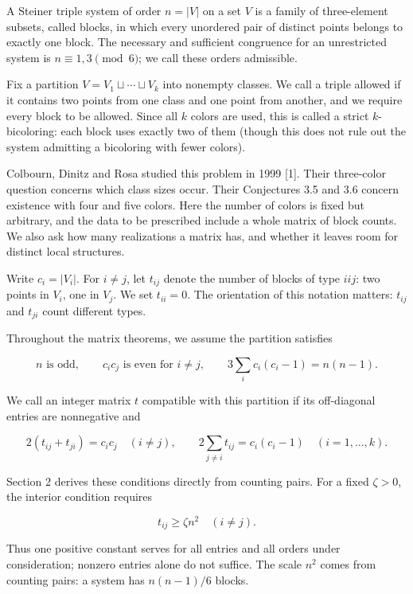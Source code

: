 \documentclass[english,11pt,a4paper]{article}
\newcounter{none}
\begin{document}
A Steiner triple system of order \(n=|V|\) on a set \(V\) is a family of three-element subsets, called blocks, in which every unordered pair of distinct points belongs to exactly one block. The necessary and sufficient congruence for an unrestricted system is \(n\equiv1,3\pmod6\); we call these orders admissible.

Fix a partition \(V=V_1\sqcup\cdots\sqcup V_k\) into nonempty classes. We call a triple allowed if it contains two points from one class and one point from another, and we require every block to be allowed. Since all \(k\) colors are used, this is called a strict \(k\)-bicoloring: each block uses exactly two of them (though this does not rule out the system admitting a bicoloring with fewer colors).

Colbourn, Dinitz and Rosa studied this problem in 1999 {[}1{]}. Their three-color question concerns which class sizes occur. Their Conjectures 3.5 and 3.6 concern existence with four and five colors. Here the number of colors is fixed but arbitrary, and the data to be prescribed include a whole matrix of block counts. We also ask how many realizations a matrix has, and whether it leaves room for distinct local structures.

Write \(c_i=|V_i|\). For \(i\ne j\), let \(t_{ij}\) denote the number of blocks of type \(iij\): two points in \(V_i\), one in \(V_j\). We set \(t_{ii}=0\). The orientation of this notation matters: \(t_{ij}\) and \(t_{ji}\) count different types.

Throughout the matrix theorems, we assume the partition satisfies

\[n\text{ is odd},\qquad c_ic_j\text{ is even for }i\ne j,
\qquad 3\sum_i c_i(c_i-1)=n(n-1).
\tag{1.1}\]

We call an integer matrix \(t\) compatible with this partition if its off-diagonal entries are nonnegative and

\[2(t_{ij}+t_{ji})=c_ic_j\quad(i\ne j),\qquad
2\sum_{j\ne i}t_{ij}=c_i(c_i-1)\quad(i=1,\ldots,k).
\tag{1.2}\]

Section 2 derives these conditions directly from counting pairs. For a fixed \(\zeta>0\), the interior condition requires

\[t_{ij}\ge\zeta n^2\quad(i\ne j).\tag{1.3}\]

Thus one positive constant serves for all entries and all orders under consideration; nonzero entries alone do not suffice. The scale \(n^2\) comes from counting pairs: a system has \(n(n-1)/6\) blocks.
\end{document}
